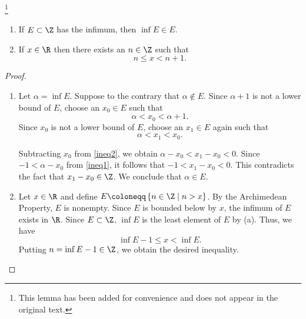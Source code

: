 \begin{lemma}\label{greatest integer} \footnote{This lemma has been added for convenience and does not appear in the original text.}
\begin{enumerate}
\item[(a)] If $E \subset \Z$ has the infimum, then $\inf E \in E$.
\item[(b)] If $x \in \R$ then there exists an $n \in \Z$ such that \[n \leq x < n+1.\]
\end{enumerate}
\end{lemma}
\begin{proof}
\,
\begin{enumerate}
\item[(a)] Let $\alpha = \inf E$.
Suppose to the contrary that $\alpha \notin E$. 
Since $\alpha+1$ is not a lower bound of $E$, choose an $x_0 \in E$ such that 
\begin{equation}\label{ineq1}
    \alpha<x_0<\alpha+1.
\end{equation}
Since $x_0$ is not a lower bound of $E$, choose an $x_1 \in E$ again such that
\begin{equation}\label{ineq2}
    \alpha<x_1<x_0.
\end{equation}

Subtracting $x_0$ from \eqref{ineq2}, we obtain $\alpha-x_0<x_1-x_0<0$. 
Since $-1<\alpha-x_0$ from \eqref{ineq1}, it follows that $-1<x_1-x_0<0$.
This contradicts the fact that $x_1-x_0 \in \Z$.
We conclude that $\alpha \in E$.
\item[(b)] Let $x \in \R$ and define $E \coloneqq \left\{n \in \Z \mid n>x \right\}$.
By the Archimedean Property, $E$ is nonempty. 
Since $E$ is bounded below by $x$, the infimum of $E$ exists in $\R$. 
Since $E \subset \Z$, $\inf E$ is the least element of $E$ by (a).
Thus, we have \[\inf E -1 \leq x < \inf E.\]
Putting $n= \inf E -1 \in \Z$, we obtain the desired inequality.
\end{enumerate}
\end{proof}
